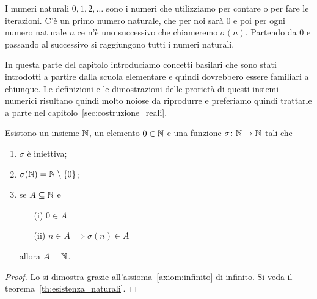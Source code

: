 I numeri naturali $0,1,2,\dots$ sono i numeri che utilizziamo per contare o per 
fare le iterazioni. C'è un primo numero naturale, che per noi sarà $0$ e poi
per ogni numero naturale $n$ ce n'è uno successivo che chiameremo $\sigma(n)$. 
Partendo da $0$ e passando al successivo si raggiungono tutti i numeri naturali.

In questa parte del capitolo introduciamo concetti basilari 
che sono stati introdotti a partire dalla scuola elementare 
e quindi dovrebbero essere familiari a chiunque. 
Le definizioni e le dimostrazioni delle prorietà di questi insiemi numerici 
risultano quindi molto noiose da riprodurre e preferiamo 
quindi trattarle a parte nel capitolo~\ref{sec:costruzione_reali}.

\begin{theorem}
  \label{th:assiomi_peano}%
    \label{def:naturali}%
  \index{$\NN$}%
Esistono un insieme $\NN$, 
un elemento $0\in {\mathbb N}$ 
e una funzione $\sigma\colon {\mathbb N}\to{\mathbb N}$ tali che
\begin{enumerate}
  \item $\sigma$ è iniettiva;
  \item $\sigma({\mathbb N}) = {\mathbb N} \setminus{\left\{ 0 \right\}}$;
  \item se $A\subseteq {\mathbb N}$ e 
  \begin{enumerate} 
    \item[(i)] $0\in A$ 
    \item[(ii)] $n\in A \implies \sigma(n)\in A$
  \end{enumerate}
  allora $A={\mathbb N}$.
\end{enumerate}
\end{theorem}
%
\begin{proof}
  Lo si dimostra grazie all'assioma~\ref{axiom:infinito} di infinito.
  Si veda il teorema~\ref{th:esistenza_naturali}.
\end{proof}

